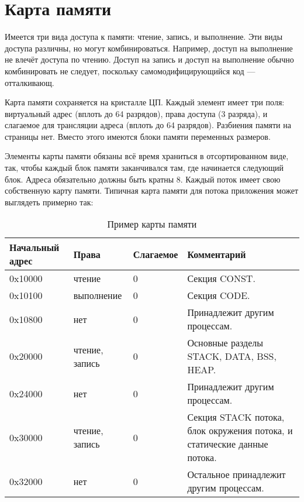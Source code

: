 \documentclass[forwardcom.tex]{subfiles}
\begin{document}
\section{Карта памяти}
Имеется три вида доступа к памяти: чтение, запись, и выполнение. Эти виды доступа различны, но могут комбинироваться. Например, доступ на выполнение не влечёт доступа по чтению. Доступ на запись и доступ на выполнение обычно комбинировать не следует, поскольку самомодифицирующийся код --- отталкивающ.

Карта памяти сохраняется на кристалле ЦП. Каждый элемент имеет три поля: виртуальный адрес (вплоть до 64 разрядов), права доступа (3 разряда), и слагаемое для трансляции адреса (вплоть до 64 разрядов). Разбиения памяти на страницы нет. Вместо этого имеются блоки памяти переменных размеров.

Элементы карты памяти обязаны всё время храниться в отсортированном виде, так, чтобы каждый блок памяти заканчивался там, где начинается следующий блок. Адреса обязательно должны быть кратны 8. Каждый поток имеет свою собственную карту памяти. Типичная карта памяти для потока приложения может выглядеть примерно так:

\begin{longtable} {|p{22mm}|p{30mm}|l|p{80mm}|}
\caption{Пример карты памяти} \\
\endfirsthead
\endhead
\hline
\bfseries Начальный адрес & \bfseries Права & \bfseries Слагаемое & \bfseries Комментарий  \\ \hline
0x10000                   & чтение          & 0                   & Секция CONST.\\
0x10100                   & выполнение      & 0                   & Секция CODE. \\
0x10800                   & нет             & 0                   & Принадлежит другим процессам. \\
0x20000                   & чтение, запись  & 0                   & Основные разделы STACK, DATA, BSS, HEAP. \\
0x24000                   & нет             & 0                   & Принадлежит другим процессам. \\
0x30000                   & чтение, запись  & 0                   & Секция STACK потока, блок окружения потока, и статические данные потока. \\
0x32000                   & нет             & 0                   & Остальное принадлежит другим процессам. \\ \hline
\end{longtable}
\end{document}
